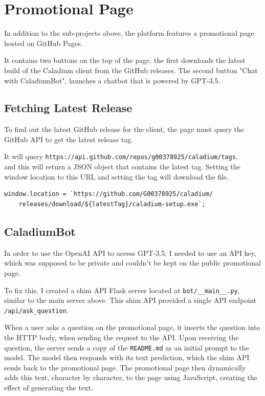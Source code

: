 \section{Promotional Page}
In addition to the sub-projects above, the platform
features a promotional page hosted on GitHub Pages.

It contains two buttons on the top of the page,
the first downloads the latest build of the
Caladium client from the GitHub releases.
The second button "Chat with CaladiumBot",
launches a chatbot that is powered by GPT-3.5.

\subsection{Fetching Latest Release}
To find out the latest GitHub release for the client,
the page must query the GitHub API to get the latest release tag.

It will query \texttt{https://api.github.com/repos/g00378925/caladium/tags}, \\
and this will return a JSON object that contains the latest tag.
Setting the window location to this URL and
setting the tag will download the file.

\begin{lstlisting}
window.location = `https://github.com/G00378925/caladium/
    releases/download/${latestTag}/caladium-setup.exe`;
\end{lstlisting}

\subsection{CaladiumBot}
In order to use the OpenAI API to access GPT-3.5,
I needed to use an API key,
which was supposed to be private and
couldn't be kept on the public promotional page.

To fix this, I created a shim API Flask server located at 
\texttt{bot/\_\_main\_\_.py}, similar to the main server above.
This shim API provided a single API endpoint \texttt{/api/ask\_question}.

When a user asks a question on the promotional page,
it inserts the question into the HTTP body,
when sending the request to the API.
Upon receiving the question,
the server sends a copy of the \texttt{README.md} 
as an initial prompt to the model.
The model then responds with its text prediction,
which the shim API sends back to the promotional page.
The promotional page then dynamically adds
this text, character by character, to the page using JavaScript,
creating the effect of generating the text.

